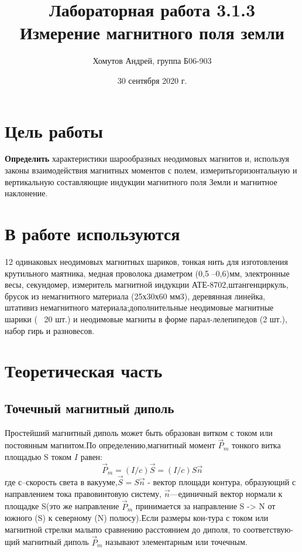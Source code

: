 \documentclass[a4paper, 12pt]{article}
\author{Хомутов Андрей, группа Б06-903}
\title{Лабораторная работа 3.1.3 \\ Измерение магнитного поля земли
}
\date{30 сентября 2020 г.}
\begin{document}
\maketitle
\thispagestyle{empty}
\newpage

\section*{Цель работы} 
\textbf{Определить} характеристики шарообразных неодимовых магнитов и, используя законы взаимодействия магнитных моментов с полем, измеритьгоризонтальную и вертикальную составляющие индукции магнитного поля Земли и магнитное наклонение.


\section*{В работе используются}
12 одинаковых неодимовых магнитных шариков, тонкая нить для изготовления крутильного маятника, медная проволока диаметром (0,5 –0,6)мм, электронные весы, секундомер, измеритель магнитной индукции АТЕ-8702,штангенциркуль, брусок из немагнитного материала  (25х30х60  мм3), деревянная  линейка, штативиз  немагнитного  материала;дополнительные неодимовые магнитные шарики (~ 20 шт.) и неодимовые магниты в форме парал-лелепипедов (2 шт.), набор гирь и разновесов.
 
\section{Теоретическая часть}
\subsection{Точечный магнитный диполь}
Простейший магнитный диполь может быть образован витком с током или постоянным магнитом.По определению,магнитный момент $\vec{P}_{m}$ тонкого витка площадью S током $I$ равен:
\begin{equation}\vec{P}_{m}=(I / c) \vec{S}=(I / c) S \vec{n}\end{equation}
где с–скорость света в вакууме,$\vec{S}=S \vec{n}$ - вектор площади контура, образующий с направлением тока правовинтовую систему,  $\vec{n}$—единичный вектор нормали к площадке S(это же направление $\vec{P}_{m}$ принимается за направление S -> N от южного (S) к северному (N) полюсу).Если размеры кон-тура с током или магнитной стрелки малыпо сравнению расстоянием до диполя, то соответствую-щий магнитный диполь $\vec{P}_{m}$ называют элементарным или точечным.
\end{document}
